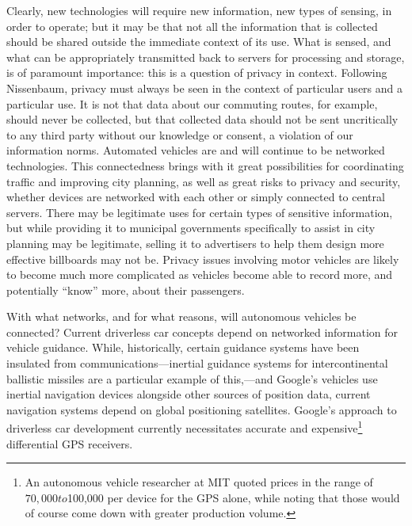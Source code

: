 Clearly, new technologies will require new information, new types of
sensing, in order to operate; but it may be that not all the
information that is collected should be shared outside the immediate
context of its use. What is sensed, and what can be appropriately
transmitted back to servers for processing and storage, is of
paramount importance: this is a question of privacy in context.\cite{nissenbaum}
Following Nissenbaum, privacy must always be seen in the context of
particular users and a particular use.\cite[p. 2]{nissenbaum} It is not that data about our
commuting routes, for example, should never be collected, but that collected data
should not be sent uncritically to any third party without our
knowledge or consent, a violation of our information norms.\cite[p. 3]{nissenbaum} 
Automated vehicles are and will continue to be networked
technologies. This connectedness brings with it great possibilities
for coordinating traffic and improving city planning, as well as great
risks to privacy and security, whether devices are networked with each
other or simply connected to central servers. There
may be legitimate uses for certain types of sensitive information, but
while providing it to municipal governments specifically to assist in
city planning may be legitimate, selling it to advertisers to help
them design more effective billboards may not be. Privacy issues
involving motor vehicles are likely to become much more complicated as
vehicles become able to record more, and potentially ``know'' more,
about their passengers.



With what networks, and for what reasons, will autonomous vehicles be
connected? Current driverless car concepts depend on networked
information for vehicle guidance. While, historically, certain
guidance systems have been insulated from communications---inertial
guidance systems for intercontinental ballistic
missiles are a particular example of this,\cite{mackenzie}---and
Google's vehicles use inertial navigation devices\cite{knightFurther}
alongside other sources of position data, current navigation systems
depend on global positioning satellites. Google's approach to
driverless car development currently necessitates accurate
and expensive\footnote{An autonomous vehicle researcher at MIT
  quoted prices in the range of $70,000 to $100,000 per device for the
GPS alone, while noting that those would of course come down with
greater production volume.} differential GPS receivers.

